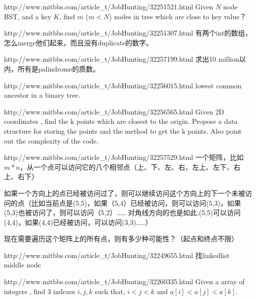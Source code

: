 \documentclass[a4paper]{article}
\begin{document}
\begin{CJK}{UTF8}{gbsn}
\begin{enumerate}
\begin{Q}[Google]{http://www.mitbbs.com/article_t/JobHunting/32251521.html}
Given $N$ node BST, and a key $K$, find $m$ ($m<N$) nodes in tree which are close to key value？
\end{Q}

\begin{Q}[Amazon]{http://www.mitbbs.com/article_t/JobHunting/32251307.html}
有两个int的数组，怎么merge他们起来，而且没有duplicate的数字。
\end{Q}

\begin{Q}{http://www.mitbbs.com/article_t/JobHunting/32257199.html}
求出10 million以内，所有是palindrome的质数。
\end{Q}

\begin{Q}[Facebook]{http://www.mitbbs.com/article_t/JobHunting/32256015.html}
lowest common ancestor in a binary tree.
\end{Q}

\begin{Q}[Facebook]{http://www.mitbbs.com/article_t/JobHunting/32256565.html}
Given 2D coordinates , find the k points which are closest to the origin. Propose a data structure for storing the points and the method to get the k points. Also point out the complexity of the code.
\end{Q}

\begin{Q}[Google]{http://www.mitbbs.com/article_t/JobHunting/32257529.html}
一个矩阵，比如$m*n$，从一个点可以访问它的八个相邻点（上、下、左、右、左上、左下、右上、右下）

如果一个方向上的点已经被访问过了，则可以继续访问这个方向上的下一个未被访问的点（比如当前点是(5,5)，如果（5,4）已经被访问，则可以访问(5,3)，如果(5,3)也被访问了，则可以访问（5,2）…… 对角线方向的也是如此,(5,5)可以访问(4,4)，如果(4,4)已经被访问，可以访问(3,3)……）

现在需要遍历这个矩阵上的所有点，则有多少种可能性？（起点和终点不限）
\end{Q}

\begin{Q}[Amazon]{http://www.mitbbs.com/article_t/JobHunting/32249655.html}
找linkedlist middle node
\end{Q}

\begin{Q}[Google]{http://www.mitbbs.com/article_t/JobHunting/32260335.html}
Given a array of integers , find 3 indexes $i,j,k$ such that, $i<j<k$ and $a[i] < a[j] < a[k]$. 
\end{Q}


\end{enumerate}
\end{CJK}
\end{document}

